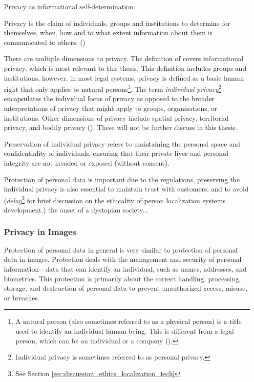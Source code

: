 Privacy as informational self-determination:

\begin{myquote}
    Privacy is the claim of individuals, groups and institutions to determine for themselves, when, how and to what extent information about them is communicated to others. (\cite{we1967privacydefinition})
\end{myquote}

There are multiple dimensions to privacy. The definition of \citeauthor{we1967privacydefinition} covers informational privacy, which is most relevant to this thesis. This definition includes groups and institutions, however, in most legal systems, privacy is defined as a basic human right that only applies to natural persons\footnote{A natural person (also sometimes referred to as a physical person) is a title used to identify an individual human being. This is different from a legal person, which can be an individual or a company (\cite{te2023naturalperson}).}. The term \textit{individual privacy}\footnote{Individual privacy is sometimes referred to as personal privacy.} encapsulates the individual focus of privacy as opposed to the broader interpretations of privacy that might apply to groups, organizations, or institutions. Other dimensions of privacy include spatial privacy, territorial privacy, and bodily privacy (\cite{fi2017privacybookchapter53}). These will not be further discuss in this thesis.

Preservation of individual privacy refers to maintaining the personal space and confidentiality of individuals, ensuring that their private lives and personal integrity are not invaded or exposed (without consent). 

Protection of personal data is important due to the regulations, preserving the individual privacy is also essential to maintain trust with customers, and to avoid (\textit{delay}\footnote{See Section \ref{sec:discussion_ethics_localization_tech}} for brief discussion on the ethicality of person localization systems development.) the onset of a dystopian society...

\subsubsection{Privacy in Images}
\label{sec:preservation_individual_privacy_in_images}
Protection of personal data in general is very similar to protection of personal data in images. Protection deals with the management and security of personal information—data that can identify an individual, such as names, addresses, and biometrics. This protection is primarily about the correct handling, processing, storage, and destruction of personal data to prevent unauthorized access, misuse, or breaches. 

